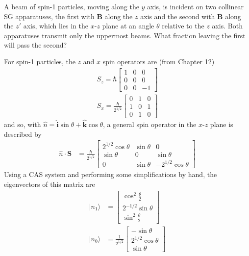 \documentclass[../principles-of-quantum-mechanics.tex]{subfiles}
\begin{document}
\begin{questions}
\begin{solution}
	\end{solution}
	
	\question A beam of spin-1 particles, moving along the $y$ axis, is incident on two collinear SG apparatuses, the first with $\mathbf{B}$ along the $z$ axis and the second with $\mathbf{B}$ along the $z'$ axis, which lies in the $x$-$z$ plane at an angle $\theta$ relative to the $z$ axis. Both apparatuses transmit only the uppermost beams. What fraction leaving the first will pass the second?
	
	\begin{solution}
		For spin-1 particles, the $z$ and $x$ spin operators are (from Chapter 12)
		\begin{gather*}
			S_z = \hbar\begin{bmatrix}1 & 0 & 0 \\ 0 & 0 & 0 \\ 0 & 0 & -1\end{bmatrix} \\
			S_x = \frac{\hbar}{2^{1/2}}\begin{bmatrix}0 & 1 & 0 \\ 1 & 0 & 1 \\ 0 & 1 & 0\end{bmatrix}
		\end{gather*}
		and so, with $\hat{n} = \hat{\mathbf{i}}\sin\theta + \hat{\mathbf{k}}\cos\theta$, a general spin operator in the $x$-$z$ plane is described by
		\begin{align*}
			\hat{n}\cdot\mathbf{S} &= \frac{\hbar}{2^{1/2}}\begin{bmatrix}2^{1/2}\cos\theta & \sin\theta & 0 \\
			\sin\theta & 0 & \sin\theta  \\
			0 & \sin\theta & -2^{1/2}\cos\theta\end{bmatrix}
		\end{align*}
		Using a CAS system and performing some simplifications by hand, the eigenvectors of this matrix are
		\begin{align*}
			|n_1\rangle &= \begin{bmatrix}\cos^2\tfrac{\theta}{2} \\
			2^{-1/2}\sin\theta \\
			\sin^2\tfrac{\theta}{2}\end{bmatrix} \\
			|n_0\rangle &= \frac{1}{2^{1/2}}\begin{bmatrix}
				-\sin\theta \\ 2^{1/2}\cos\theta \\ \sin\theta

\end{bmatrix}
\end{align*}
\end{solution}
\end{questions}
\end{document}
